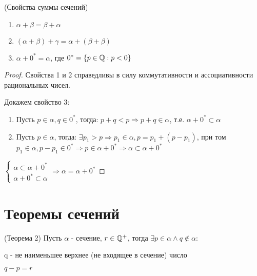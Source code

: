 \begin{theorem} (Свойства суммы сечений)
    \begin{enumerate}
        \item $\alpha + \beta = \beta + \alpha$
        \item $(\alpha + \beta) + \gamma = \alpha + (\beta + \beta)$
        \item $\alpha + 0^* = \alpha$, где $0^* = \{p \in \mathbb{Q}: p < 0\}$
    \end{enumerate}
\end{theorem}

\begin{proof}
    Свойства 1 и 2 справедливы в силу коммутативности и ассоциативности рациональных чисел.
    
    Докажем свойство 3:
    \begin{enumerate}
        \item Пусть $p \in \alpha, q \in 0^* $, тогда: $ p + q < p \Rightarrow p + q \in \alpha$, т.е. $\alpha + 0^* \subset \alpha$
        \item Пусть $p \in \alpha$, тогда: $\exists p_1 > p \Rightarrow p_1 \in \alpha, p = p_1 + (p - p_1)$, при том $p_1 \in \alpha, p - p_1 \in 0^* \Rightarrow p \in \alpha + 0^* \Rightarrow \alpha \subset \alpha + 0^*$
    \end{enumerate}

    $\begin{cases}
        \alpha \subset \alpha + 0^* \\
        \alpha + 0^* \subset \alpha
    \end{cases} \Rightarrow \alpha = \alpha + 0^*$
\end{proof}

\section{Теоремы сечений}

\begin{theorem} (Теорема 2)
    Пусть $\alpha$ - сечение, $r \in \mathbb{Q}^+$, тогда $\exists p \in \alpha \land q \notin \alpha$:

    q - не наименьшее верхнее (не входящее в сечение) число

    $q - p = r$
\end{theorem}

